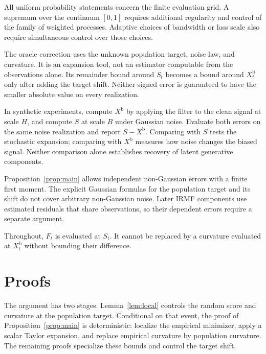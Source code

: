 \documentclass[11pt]{article}
\newcommand{\BiasedSignal}{X^{\mathrm b}}
\newcommand{\IMFs}{S}
\newcommand{\IF}{F}
\theoremstyle{definition}
\begin{document}
All uniform probability statements concern the finite evaluation grid.  A
supremum over the continuum \([0,1]\) requires additional regularity and
control of the family of weighted processes.  Adaptive choices of bandwidth
or loss scale also require simultaneous control over those choices.

The oracle correction uses the unknown population target, noise law, and
curvature.  It is an expansion tool, not an estimator computable from the
observations alone.  Its remainder bound around \(\IMFs_t\) becomes a bound
around \(\BiasedSignal_t\) only after adding the target shift.  Neither signed
error is guaranteed to have the smaller absolute value on every realization.

In synthetic experiments, compute \(\BiasedSignal\) by applying the filter to
the clean signal at scale \(H\), and compute \(\IMFs\) at scale \(B\) under
Gaussian noise.  Evaluate both errors on the same noise realization and report
\(\IMFs-\BiasedSignal\).  Comparing with \(\IMFs\) tests the stochastic
expansion; comparing with \(\BiasedSignal\) measures how noise changes the
biased signal.  Neither comparison alone establishes recovery of latent
generative components.

Proposition~\ref{prop:main} allows independent non-Gaussian errors with a
finite first moment.  The explicit Gaussian formulas for the population target
and its shift do not cover arbitrary non-Gaussian noise.  Later IRMF
components use estimated residuals that share observations, so their
dependent errors require a separate argument.

Throughout, \(\IF_t\) is evaluated at \(\IMFs_t\).  It cannot be replaced by
a curvature evaluated at \(\BiasedSignal_t\) without bounding their
difference.


\appendix
\section{Proofs}\label{sec:proofs}

The argument has two stages.  Lemma~\ref{lem:local} controls the random score
and curvature at the population target.  Conditional on that event, the proof
of Proposition~\ref{prop:main} is deterministic: localize the empirical
minimizer, apply a scalar Taylor expansion, and replace empirical curvature by
population curvature.  The remaining proofs specialize these bounds and
control the target shift.
\end{document}
